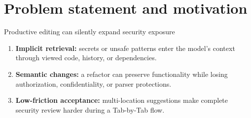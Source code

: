 \section{Problem statement and motivation}
\begin{frame}{Productive editing can silently expand security exposure}
\begin{enumerate}
\item \textbf{Implicit retrieval:} secrets or unsafe patterns enter the model's context through viewed code, history, or dependencies.
\item \textbf{Semantic changes:} a refactor can preserve functionality while losing authorization, confidentiality, or parser protections.
\item \textbf{Low-friction acceptance:} multi-location suggestions make complete security review harder during a Tab-by-Tab flow.
\end{enumerate}
\end{frame}
